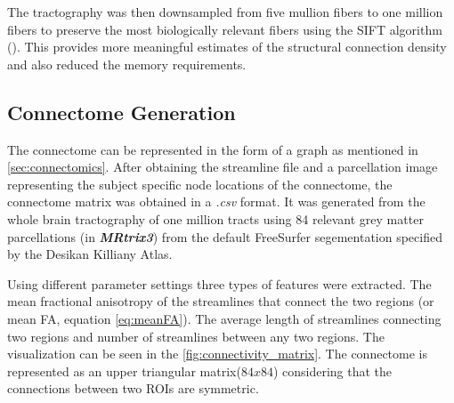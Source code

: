 \documentclass[msthesis.tex]{subfiles}
\begin{document}
The tractography was then downsampled from five mullion fibers to one million fibers to preserve the most biologically relevant fibers using the SIFT algorithm (\cite{smith2013sift}). This provides more meaningful estimates of the structural connection density and also reduced the memory requirements. 

\subsection{Connectome Generation}
\label{subsec:connectomegeneration}
The connectome can be represented in the form of a graph as mentioned in \autoref{sec:connectomics}. After obtaining the streamline file and a parcellation image representing the subject specific node locations of the connectome, the connectome matrix was obtained in a \textit{.csv} format. It was generated from the whole brain tractography of one million tracts using 84 relevant grey matter parcellations (in \textit{\textbf{MRtrix3}}) from the default FreeSurfer segementation specified by the Desikan Killiany Atlas. 

Using different parameter settings three types of features were extracted. The mean fractional anisotropy of the streamlines that connect the two regions (or mean FA, equation \autoref{eq:meanFA}). The average length of streamlines connecting two regions and number of streamlines between any two regions. The visualization can be seen in the \autoref{fig:connectivity_matrix}. The connectome is represented as an upper triangular matrix($84 x 84$) considering that the connections between two ROIs are symmetric.
\end{document}
